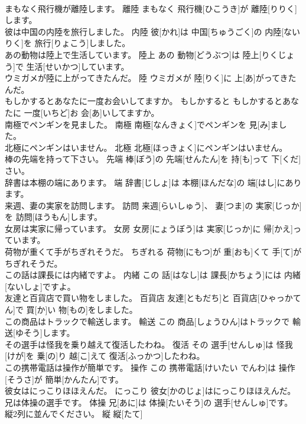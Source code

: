 \documentclass[8pt]{extreport}
\begin{document}
\begin{CJK}{UTF8}{min}
\\	まもなく飛行機が離陸します。	離陸	まもなく 飛行機[ひこうき]が 離陸[りりく]します。	
\\	彼は中国の内陸を旅行しました。	内陸	彼[かれ]は 中国[ちゅうごく]の 内陸[ないりく]を 旅行[りょこう]しました。	
\\	あの動物は陸上で生活しています。	陸上	あの 動物[どうぶつ]は 陸上[りくじょう]で 生活[せいかつ]しています。	
\\	ウミガメが陸に上がってきたんだ。	陸	ウミガメが 陸[りく]に 上[あ]がってきたんだ。	
\\	もしかするとあなたに一度お会いしてますか。	もしかすると	もしかするとあなたに 一度[いちど]お 会[あ]いしてますか。	
\\	南極でペンギンを見ました。	南極	南極[なんきょく]でペンギンを 見[み]ました。	
\\	北極にペンギンはいません。	北極	北極[ほっきょく]にペンギンはいません。	
\\	棒の先端を持って下さい。	先端	棒[ぼう]の 先端[せんたん]を 持[も]って 下[くだ]さい。	
\\	辞書は本棚の端にあります。	端	辞書[じしょ]は 本棚[ほんだな]の 端[はし]にあります。	
\\	来週、妻の実家を訪問します。	訪問	来週[らいしゅう]、 妻[つま]の 実家[じっか]を 訪問[ほうもん]します。	
\\	女房は実家に帰っています。	女房	女房[にょうぼう]は 実家[じっか]に 帰[かえ]っています。	
\\	荷物が重くて手がちぎれそうだ。	ちぎれる	荷物[にもつ]が 重[おも]くて 手[て]がちぎれそうだ。	
\\	この話は課長には内緒ですよ。	内緒	この 話[はなし]は 課長[かちょう]には 内緒[ないしょ]ですよ。	
\\	友達と百貨店で買い物をしました。	百貨店	友達[ともだち]と 百貨店[ひゃっかてん]で 買[か]い 物[もの]をしました。	
\\	この商品はトラックで輸送します。	輸送	この 商品[しょうひん]はトラックで 輸送[ゆそう]します。	
\\	その選手は怪我を乗り越えて復活したわね。	復活	その 選手[せんしゅ]は 怪我[けが]を 乗[の]り 越[こ]えて 復活[ふっかつ]したわね。	
\\	この携帯電話は操作が簡単です。	操作	この 携帯電話[けいたい でんわ]は 操作[そうさ]が 簡単[かんたん]です。	
\\	彼女はにっこりほほえんだ。	にっこり	彼女[かのじょ]はにっこりほほえんだ。	
\\	兄は体操の選手です。	体操	兄[あに]は 体操[たいそう]の 選手[せんしゅ]です。	
\\	縦2列に並んでください。	縦	縦[たて] 

\end{CJK}
\end{document}
